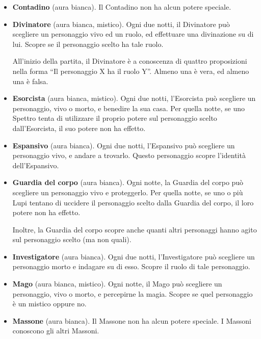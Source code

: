 \documentclass[a4paper,10pt]{article}
\begin{document}
\begin{itemize}
	
	\item {\bf Contadino} (aura bianca). Il Contadino non ha alcun potere speciale.

	\item {\bf Divinatore} (aura bianca, mistico). Ogni due notti, il Divinatore può scegliere un personaggio vivo ed un ruolo, ed effettuare una divinazione su di lui. Scopre se il personaggio scelto ha tale ruolo.
	
	All'inizio della partita, il Divinatore è a conoscenza di quattro proposizioni nella forma ``Il personaggio X ha il ruolo Y''. Almeno una è vera, ed almeno una è falsa.

	\item {\bf Esorcista} (aura bianca, mistico). Ogni due notti, l'Esorcista può scegliere un personaggio, vivo o morto, e benedire la sua casa. Per quella notte, se uno Spettro tenta di utilizzare il proprio potere sul personaggio scelto dall'Esorcista, il suo potere non ha effetto.
 
	\item {\bf Espansivo} (aura bianca). Ogni due notti, l'Espansivo può scegliere un personaggio vivo, e andare a trovarlo. Questo personaggio scopre l'identità dell'Espansivo.

	\item {\bf Guardia del corpo} (aura bianca). Ogni notte, la Guardia del corpo può scegliere un personaggio vivo e proteggerlo. Per quella notte, se uno o più Lupi tentano di uccidere il personaggio scelto dalla Guardia del corpo, il loro potere non ha effetto.

	Inoltre, la Guardia del corpo scopre anche quanti altri personaggi hanno agito sul personaggio scelto (ma non quali).
 
	\item {\bf Investigatore} (aura bianca). Ogni due notti, l'Investigatore può scegliere un personaggio morto e indagare su di esso. Scopre il ruolo di tale personaggio.

	\item {\bf Mago} (aura bianca, mistico). Ogni notte, il Mago può scegliere un personaggio, vivo o morto, e percepirne la magia. Scopre se quel personaggio è un mistico oppure no.
 
	\item {\bf Massone} (aura bianca). Il Massone non ha alcun potere speciale. I Massoni conoscono gli altri Massoni.
 

\end{itemize}
\end{document}
